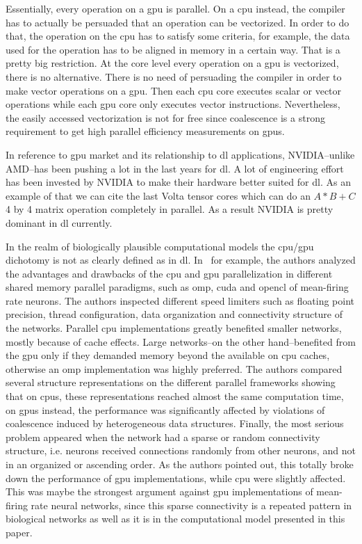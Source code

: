 \documentclass[10pt,journal,compsoc]{IEEEtran}
\begin{document}
Essentially, every operation on a \gls{gpu} is parallel. On a \gls{cpu} instead, the compiler has to actually be persuaded that an operation can be vectorized. In order to do that, the operation on the \gls{cpu} has to satisfy some criteria, for example, the data used for the operation has to be aligned in memory in a certain way. That is a pretty big restriction. At the core level every operation on a \gls{gpu} is vectorized, there is no alternative. There is no need of persuading the compiler in order to make vector operations on a \gls{gpu}. Then each \gls{cpu} core executes scalar or vector operations while each \gls{gpu} core only executes vector instructions. Nevertheless, the easily accessed vectorization is not for free since coalescence is a strong requirement to get high parallel efficiency measurements on \glspl{gpu}.

In reference to \gls{gpu} market and its relationship to \gls{dl} applications, NVIDIA--unlike AMD--has been pushing a lot in the last years for \gls{dl}. A lot of engineering effort has been invested by NVIDIA to make their hardware better suited for \gls{dl}. As an example of that we can cite the last Volta tensor cores which can do an $A*B+C$ 4 by 4 matrix operation completely in parallel. As a result NVIDIA is pretty dominant in \gls{dl} currently.

In the realm of biologically plausible computational models the \gls{cpu}/\gls{gpu} dichotomy is not as clearly defined as in \gls{dl}. In~\cite{doi:10.3109/0954898X.2012.739292} for example, the authors analyzed the advantages and drawbacks of the \gls{cpu} and \gls{gpu} parallelization in different shared memory parallel paradigms, such as \gls{omp}, \gls{cuda} and \gls{opencl} of mean-firing rate neurons. The authors inspected different speed limiters such as floating point precision, thread configuration, data organization and connectivity structure of the networks. Parallel \gls{cpu} implementations greatly benefited smaller networks, mostly because of cache effects. Large networks--on the other hand--benefited from the \gls{gpu} only if they demanded memory beyond the available on \gls{cpu} caches, otherwise an \gls{omp} implementation was highly preferred. The authors compared several structure representations on the different parallel frameworks showing that on \glspl{cpu}, these representations reached almost the same computation time, on \glspl{gpu} instead, the performance was significantly affected by violations of coalescence induced by heterogeneous data structures. Finally, the most serious problem appeared when the network had a sparse or random connectivity structure, i.e. neurons received connections randomly from other neurons, and not in an organized or ascending order. As the authors pointed out, this totally broke down the performance of \gls{gpu} implementations, while \gls{cpu} were slightly affected. This was maybe the strongest argument against \gls{gpu} implementations of mean-firing rate neural networks, since this sparse connectivity is a repeated pattern in biological networks as well as it is in the computational model presented in this paper.
\end{document}
